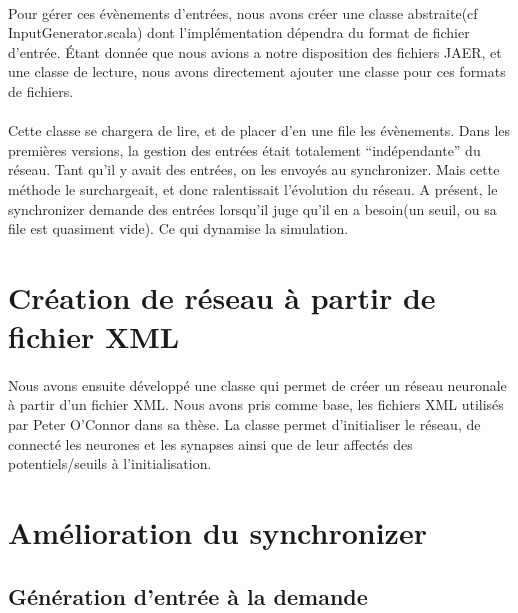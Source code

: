 \documentclass[a4paper,10pt]{article}
\begin{document}
\paragraph{}
Pour gérer ces évènements d’entrées, nous avons créer une classe abstraite(cf InputGenerator.scala) dont l’implémentation dépendra du format de fichier d’entrée. Étant donnée que nous avions a notre disposition des fichiers JAER, et une classe de lecture, nous avons directement ajouter une classe pour ces formats de fichiers.

\paragraph{}
Cette classe se chargera de lire, et de placer d’en une file les évènements. Dans les premières versions, la gestion des entrées était totalement “indépendante” du réseau. Tant qu’il y avait des entrées, on les envoyés au synchronizer. Mais cette méthode le surchargeait, et donc ralentissait l’évolution du réseau. A présent, le synchronizer demande des entrées lorsqu’il juge qu’il en a besoin(un seuil, ou sa file est quasiment vide). Ce qui dynamise la simulation.

\newpage

\section{Création de réseau à partir de fichier XML}

\paragraph{}
Nous avons ensuite développé une classe qui permet de créer un réseau neuronale à partir d’un fichier XML.
Nous avons pris comme base, les fichiers XML utilisés par Peter O’Connor dans sa thèse. La classe permet d’initialiser le réseau, de connecté les neurones et les synapses ainsi que de leur affectés des potentiels/seuils à l’initialisation.

\section{Amélioration du synchronizer}

\subsection{Génération d'entrée à la demande}
\subsection{}
\end{document}
